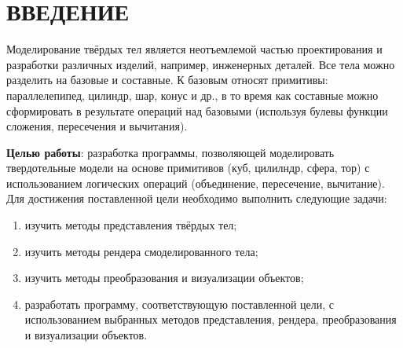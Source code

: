 \section*{ВВЕДЕНИЕ}

Моделирование твёрдых тел является неотъемлемой частью проектирования и разработки различных изделий, например, инженерных деталей. 
Все тела можно разделить на базовые и составные. 
К базовым относят примитивы: параллелепипед, цилиндр, шар, конус и др., в то время как составные можно сформировать в результате операций над базовыми (используя булевы функции сложения, пересечения и вычитания). 

\textbf{Целью работы}: разработка программы, позволяющей моделировать твердотельные модели на основе примитивов (куб, цилилндр, сфера, тор) с использованием логических операций (объединение, пересечение, вычитание).
Для достижения поставленной цели необходимо выполнить следующие задачи:
\begin{enumerate}[label=\arabic*)]
	\item изучить методы представления твёрдых тел;
	\item изучить методы рендера смоделированного тела;
	\item изучить методы преобразования и визуализации объектов;
	\item разработать программу, соответствующую поставленной цели, с использованием выбранных методов представления, рендера, преобразования и визуализации объектов.
\end{enumerate}

